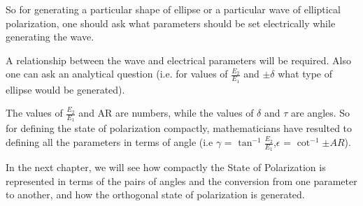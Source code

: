So for generating a particular shape of ellipse or a particular wave of elliptical polarization, one should ask what parameters should be set electrically while generating the wave.

A relationship between the wave and electrical parameters will be required. Also one can ask an analytical question (i.e. for values of $\frac{E_2}{E_1} $ and $ \pm \delta $ what type of ellipse would be generated).

The values of $\frac{E_2}{E_1}$ and AR are numbers, while the values of $\delta$ and $\tau $ are angles. So for defining the state of polarization compactly, mathematicians have resulted to defining all the parameters in terms of angle (i.e $\gamma $ = $\tan^{-1} {\frac{E_2}{E_1}} $,\hspace{0.15cm}$\epsilon $ = $ \cot^{-1} {\pm AR} $). 

In the next chapter, we will see how compactly the State of Polarization is represented in terms of the pairs of angles and the conversion from one parameter to another, and how the orthogonal state of polarization is generated.
